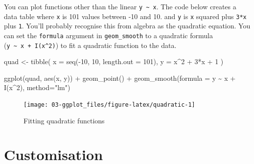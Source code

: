 \documentclass[
  oneside]{book}
\newenvironment{Shaded}{\begin{snugshade}}{\end{snugshade}}
\newcommand{\AttributeTok}[1]{\textcolor[rgb]{0.77,0.63,0.00}{#1}}
\newcommand{\DecValTok}[1]{\textcolor[rgb]{0.00,0.00,0.81}{#1}}
\newcommand{\FunctionTok}[1]{\textcolor[rgb]{0.00,0.00,0.00}{#1}}
\newcommand{\NormalTok}[1]{#1}
\newcommand{\OtherTok}[1]{\textcolor[rgb]{0.56,0.35,0.01}{#1}}
\newcommand{\SpecialCharTok}[1]{\textcolor[rgb]{0.00,0.00,0.00}{#1}}
\newcommand{\StringTok}[1]{\textcolor[rgb]{0.31,0.60,0.02}{#1}}
\begin{document}
\begin{info}

You can plot functions other than the linear \texttt{y\ \textasciitilde{}\ x}. The code below creates a data table where \texttt{x} is 101 values between -10 and 10. and \texttt{y} is \texttt{x} squared plus \texttt{3*x} plus \texttt{1}. You'll probably recognise this from algebra as the quadratic equation. You can set the \texttt{formula} argument in \texttt{geom\_smooth} to a quadratic formula (\texttt{y\ \textasciitilde{}\ x\ +\ I(x\^{}2)}) to fit a quadratic function to the data.

\begin{Shaded}
\begin{Highlighting}[]
\NormalTok{quad }\OtherTok{\textless{}{-}} \FunctionTok{tibble}\NormalTok{(}
  \AttributeTok{x =} \FunctionTok{seq}\NormalTok{(}\SpecialCharTok{{-}}\DecValTok{10}\NormalTok{, }\DecValTok{10}\NormalTok{, }\AttributeTok{length.out =} \DecValTok{101}\NormalTok{),}
  \AttributeTok{y =}\NormalTok{ x}\SpecialCharTok{\^{}}\DecValTok{2} \SpecialCharTok{+} \DecValTok{3}\SpecialCharTok{*}\NormalTok{x }\SpecialCharTok{+} \DecValTok{1}
\NormalTok{)}

\FunctionTok{ggplot}\NormalTok{(quad, }\FunctionTok{aes}\NormalTok{(x, y)) }\SpecialCharTok{+}
  \FunctionTok{geom\_point}\NormalTok{() }\SpecialCharTok{+}
  \FunctionTok{geom\_smooth}\NormalTok{(}\AttributeTok{formula =}\NormalTok{ y }\SpecialCharTok{\textasciitilde{}}\NormalTok{ x }\SpecialCharTok{+} \FunctionTok{I}\NormalTok{(x}\SpecialCharTok{\^{}}\DecValTok{2}\NormalTok{), }
              \AttributeTok{method=}\StringTok{"lm"}\NormalTok{)}
\end{Highlighting}
\end{Shaded}

\begin{figure}

{\centering \texttt{[image: 03-ggplot\_files/figure-latex/quadratic-1]} 

}

\caption{Fitting quadratic functions}\label{fig:quadratic}
\end{figure}

\end{info}

\hypertarget{customisation}{%
\section{Customisation}\label{customisation}}
\end{document}

